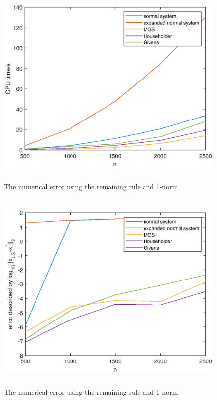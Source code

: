 \documentclass[UTF8,a4paper,10pt]{ctexart}
\begin{document}
\begin{figure}[ht]
    \centering
    \includegraphics[width=14cm,height=10cm]{2_CPU.eps}
    \caption{The numerical error using the remaining rule and 1-norm}
\end{figure}
\begin{figure}[ht]
    \centering
    \includegraphics[width=14cm,height=10cm]{2_error.eps}
    \caption{The numerical error using the remaining rule and 1-norm}
\end{figure}
\end{document}
